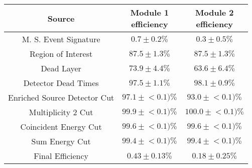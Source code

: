 \begin{tabular}{|c|c|c|}
\hline
  Source & \makecell{Module 1\\efficiency} & \makecell{Module 2\\efficiency} \\
\hline
  M. S. Event Signature & $0.7 \pm 0.2\%$ & $0.3 \pm 0.5\%$ \\
  Region of Interest & $87.5 \pm 1.3\%$ & $87.5 \pm 1.3\%$ \\
  Dead Layer & $73.9 \pm 4.4\%$ & $63.6 \pm 6.4\%$ \\
  Detector Dead Times & $97.5 \pm 1.1\%$ & $98.1 \pm 0.9\%$ \\
  Enriched Source Detector Cut & $97.1 \pm{}<\!0.1)\%$ & $93.0 \pm{}<\!0.1)\%$ \\
  Multiplicity 2 Cut & $99.9 \pm{}<\!0.1)\%$ & $100.0 \pm{}<\!0.1)\%$ \\
  Coincident Energy Cut & $99.6 \pm{}<\!0.1)\%$ & $99.6 \pm{}<\!0.1)\%$ \\
  Sum Energy Cut & $99.4 \pm{}<\!0.1)\%$ & $99.4 \pm{}<\!0.1)\%$ \\
  \hline Final Efficiency & $0.43 \pm 0.13\%$ & $0.18 \pm 0.25\%$ \\
\hline
\end{tabular}
